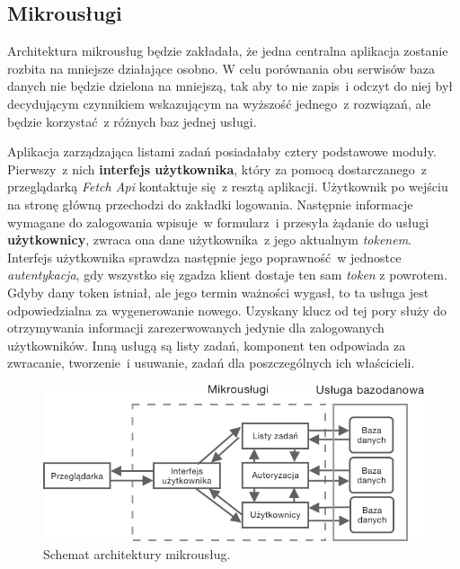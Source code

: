 \subsection{Mikrousługi}
Architektura mikrousług będzie zakładała, że jedna centralna aplikacja zostanie rozbita na mniejsze działające osobno. W celu porównania obu serwisów baza danych nie będzie dzielona na mniejszą, tak aby to nie zapis~i odczyt do niej był decydującym czynnikiem wskazującym na wyższość jednego~z rozwiązań, ale będzie korzystać~z różnych baz jednej usługi.

Aplikacja zarządzająca listami zadań posiadałaby cztery podstawowe moduły. Pierwszy~z nich \textbf{interfejs użytkownika}, który za pomocą dostarczanego~z przeglądarką \textit{Fetch Api}\cite{mdn} kontaktuje się~z resztą aplikacji. Użytkownik po wejściu na stronę główną przechodzi do zakładki logowania. Następnie informacje wymagane do zalogowania wpisuje~w formularz~i przesyła żądanie do usługi \textbf{użytkownicy}, zwraca ona dane użytkownika~z jego aktualnym \textit{tokenem}. Interfejs użytkownika sprawdza następnie jego poprawność~w jednostce \textit{autentykacja}\cite{Herman:2017}, gdy wszystko się zgadza klient dostaje ten sam \textit{token} z powrotem. Gdyby dany token istniał, ale jego termin ważności wygasł, to ta usługa jest odpowiedzialna za wygenerowanie nowego. Uzyskany klucz od tej pory służy do otrzymywania informacji zarezerwowanych jedynie dla zalogowanych użytkowników. Inną usługą są listy zadań, komponent ten odpowiada za zwracanie, tworzenie~i usuwanie, zadań dla poszczególnych ich właścicieli.
\begin{figure}[h!]
	\centering
		\includegraphics[width=14cm]{Rysunki/Rozdzial3/architekturaMirko.png}
		\caption{Schemat architektury mikrousług.}	
		\label{fig:architekturaMikro}
	\end{figure}

